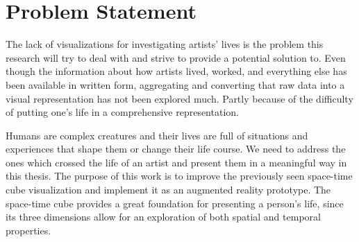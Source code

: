 \section{Problem Statement}\label{sec:problem-statement}
The lack of visualizations for investigating artists’ lives is the problem this research will try to deal with and strive to provide a potential
solution to. Even though the information about how artists lived, worked, and everything else has been available in written form, aggregating and
converting that raw data into a visual representation has not been explored much. Partly because of the difficulty of putting one's life in
a comprehensive representation.

Humans are complex creatures and their lives are full of situations and experiences that shape them or change their life course. We need to
address the ones which crossed the life of an artist and present them in a meaningful way in this thesis. The purpose of this work is to improve the
previously seen space-time cube visualization and implement it as an augmented reality prototype. The space-time cube provides a great
foundation for presenting a person’s life, since its three dimensions allow for an exploration of both spatial and temporal properties.